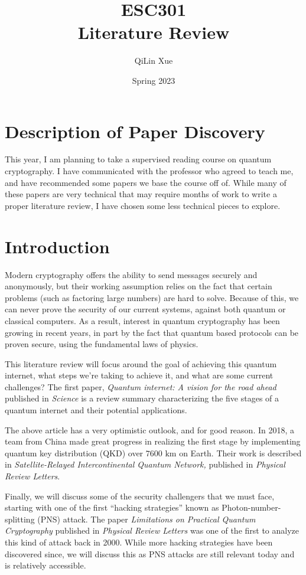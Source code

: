 \documentclass{article}
\title{ESC301 \\ Literature Review \vspace{-2mm}}
\author{QiLin Xue}
\date{\vspace{-5mm}Spring 2023}
\numberwithin{equation}{section}
\begin{document}
\maketitle
\section{Description of Paper Discovery}
This year, I am planning to take a supervised reading course on quantum cryptography. I have communicated with the professor who agreed to teach me, and have recommended some papers we base the course off of. While many of these papers are very technical that may require months of work to write a proper literature review, I have chosen some less technical pieces to explore.

\section{Introduction}
Modern cryptography offers the ability to send messages securely and anonymously, but their working assumption relies on the fact that certain problems (such as factoring large numbers) are hard to solve. Because of this, we can never prove the security of our current systems, against both quantum or classical computers. As a result, interest in quantum cryptography has been growing in recent years, in part by the fact that quantum based protocols can be proven secure, using the fundamental laws of physics. 

This literature review will focus around the goal of achieving this quantum internet, what steps we're taking to achieve it, and what are some current challenges? The first paper, \textit{Quantum internet: A vision for the road ahead} published in \textit{Science} is a review summary characterizing the five stages of a quantum internet and their potential applications\cite{Wehner2018}. 

The above article has a very optimistic outlook, and for good reason. In 2018, a team from China made great progress in realizing the first stage by implementing quantum key distribution (QKD) over $7600\text{ km}$ on Earth. Their work is described in \textit{Satellite-Relayed Intercontinental Quantum Network,} published in \textit{Physical Review Letters}\cite{Liao2018}.

Finally, we will discuss some of the security challengers that we must face, starting with one of the first ``hacking strategies'' known as Photon-number-splitting (PNS) attack. The paper \textit{Limitations on Practical Quantum Cryptography} published in \textit{Physical Review Letters} was one of the first to analyze this kind of attack back in 2000\cite{Brassard2000}. While more hacking strategies have been discovered since, we will discuss this as PNS attacks are still relevant today and is relatively accessible.
\end{document}
